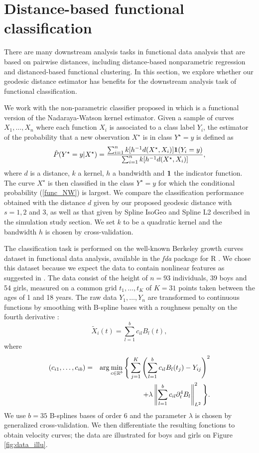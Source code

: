 \section{Distance-based functional classification}\label{distance-based-functional-classification-marie}

There are many downstream analysis tasks in functional data analysis that are based on pairwise distances, including distance-based nonparametric regression and distanced-based functional clustering.
In this section, we explore whether our geodesic distance estimator has
benefits for the downstream analysis task of functional classification. 

We work with the non-parametric classifier proposed in \cite{Ferraty2006} which is a functional version of the Nadaraya-Watson kernel estimator. Given a sample of curves $X_1,\ldots,X_n$ where each function $X_i$ is associated to a class label $Y_i$, the estimator of the probability that a new observation $X^\star$ is in class $Y^\star=y$ is defined as
\begin{equation}\label{func_NW}
\hat P(Y^\star = y | X^\star)= \frac{ \sum_{i=1}^n k[h^{-1} d(X^\star,X_i)] {\bf{1}}(Y_i = y) }{ \sum_{i=1}^n k[h^{-1} d(X^\star,X_i)] },
\end{equation}
where $d$ is a distance, $k$ a kernel, $h$ a bandwidth and $\bf{1}$ the indicator function. The curve $X^\star$ is then classified in the class $Y^\star =y$ for which the conditional probability (\ref{func_NW}) is largest. We compare the classification performance obtained with the distance $d$ given by our proposed geodesic distance with $s=1,2$ and $3$, as well as that given by Spline IsoGeo and Spline L2 described in the simulation study section. We set $k$ to be a quadratic kernel and the bandwidth $h$ is chosen by cross-validation. 

The classification task is performed on the well-known Berkeley growth curves dataset in functional data analysis, available in the \emph{fda} package \cite{Ram-Hoo-Gra} for R \cite{Rproject}. We chose this dataset because we expect the data to contain nonlinear features as suggested in \cite{ChenMuller2012}. The data consist of the height of $n=93$ individuals, 39 boys and 54 girls, measured on a common grid $t_1,\ldots,t_K$ of $K=31$ points taken between the ages of 1 and 18 years. The raw data $Y_1,\ldots,Y_n$ are transformed to continuous functions by smoothing with B-spline bases with a roughness penalty on the fourth derivative :
$$\tilde X_i(t) = \sum_{l=1}^{b} c_{il}B_l(t), $$
where
 \begin{eqnarray*}
 (c_{i1},\ldots,c_{ib})&=&\arg \min_{c\in \mathbb{R}^b}\Bigg\{\sum_{j=1}^K\left(\sum_{l=1}^{b} c_{il}B_l(t_j)-Y_{ij}\right)^2\\
 &&\quad +\lambda \left\|\sum_{l=1}^{b} c_{il}\partial^4_tB_l\right\|^2_{L^2}\Bigg\}.
 \end{eqnarray*} 
We use $b=35$ B-splines bases of order 6 and the parameter $\lambda$ is chosen by generalized cross-validation. We then differentiate the resulting fonctions to obtain velocity curves; the data are illustrated for boys and girls on Figure \ref{fig:data_illu}.





